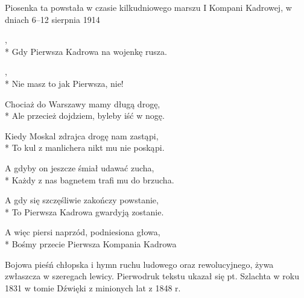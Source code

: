 \begin{info}Piosenka ta powstała w czasie kilkudniowego marszu I Kompani Kadrowej, w dniach 6–12 sierpnia 1914\end{info}

\begin{lyrics}[longestline={Ale przecież dojdziem, byleby iść w nogę.}]

,\\*
Gdy Pierwsza Kadrowa na wojenkę rusza.

\begin{chorus}
,\\*
Nie masz to jak Pierwsza, nie!
\end{chorus}

Chociaż do Warszawy mamy długą drogę,\\*
Ale przecież dojdziem, byleby iść w nogę.

\chorusref

Kiedy Moskal zdrajca drogę nam zastąpi,\\*
To kul z manlichera nikt mu nie poskąpi.

\chorusref

A gdyby on jeszcze śmiał udawać zucha,\\*
Każdy z nas bagnetem trafi mu do brzucha.

\chorusref

A gdy się szczęśliwie zakończy powstanie,\\*
To Pierwsza Kadrowa gwardyją zostanie.

\chorusref

A więc piersi naprzód, podniesiona głowa,\\*
Bośmy przecie Pierwsza Kompania Kadrowa

\chorusref
\end{lyrics}



\begin{info}Bojowa pieśń chłopska i hymn ruchu ludowego oraz rewolucyjnego, żywa zwłaszcza w szeregach lewicy. Pierwodruk tekstu ukazał się pt. Szlachta w roku 1831 w tomie Dźwięki z minionych lat z 1848 r.\end{info}

